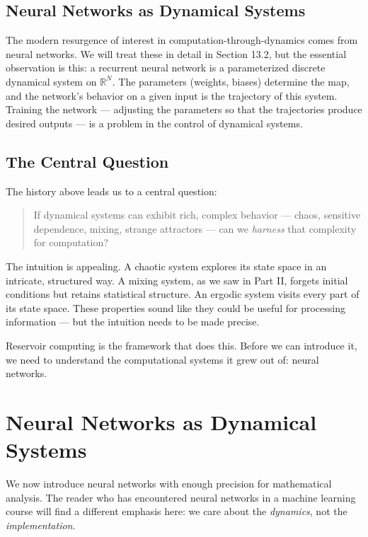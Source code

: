 \subsection{Neural Networks as Dynamical Systems}\label{sec:13.1.3}

The modern resurgence of interest in computation-through-dynamics comes from neural networks. We will treat these in detail in Section 13.2, but the essential observation is this: a recurrent neural network is a parameterized discrete dynamical system on $\mathbb{R}^N$. The parameters (weights, biases) determine the map, and the network's behavior on a given input is the trajectory of this system. Training the network --- adjusting the parameters so that the trajectories produce desired outputs --- is a problem in the control of dynamical systems.

\subsection{The Central Question}\label{sec:13.1.4}

The history above leads us to a central question:

\begin{quote}
If dynamical systems can exhibit rich, complex behavior --- chaos, sensitive dependence, mixing, strange attractors --- can we \textit{harness} that complexity for computation?
\end{quote}

The intuition is appealing. A chaotic system explores its state space in an intricate, structured way. A mixing system, as we saw in Part II, forgets initial conditions but retains statistical structure. An ergodic system visits every part of its state space. These properties sound like they could be useful for processing information --- but the intuition needs to be made precise.

Reservoir computing is the framework that does this. Before we can introduce it, we need to understand the computational systems it grew out of: neural networks.


\bigskip


\section{Neural Networks as Dynamical Systems}\label{sec:13.2}

We now introduce neural networks with enough precision for mathematical analysis. The reader who has encountered neural networks in a machine learning course will find a different emphasis here: we care about the \textit{dynamics}, not the \textit{implementation}.

